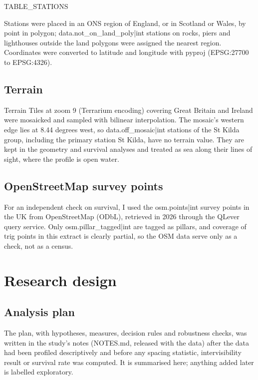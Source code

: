 \documentclass[11pt,a4paper]{article}
\begin{document}
{{TABLE_STATIONS}}

Stations were placed in an ONS region of England, or in Scotland or Wales, by point in polygon; {{data.not_on_land_poly|int}} stations on rocks, piers and lighthouses outside the land polygons were assigned the nearest region. Coordinates were converted to latitude and longitude with pyproj (EPSG:27700 to EPSG:4326).

\subsection{Terrain}
Terrain Tiles at zoom 9 (Terrarium encoding) covering Great Britain and Ireland were mosaicked and sampled with bilinear interpolation. The mosaic's western edge lies at 8.44 degrees west, so {{data.off_mosaic|int}} stations of the St Kilda group, including the primary station St Kilda, have no terrain value. They are kept in the geometry and survival analyses and treated as sea along their lines of sight, where the profile is open water.

\subsection{OpenStreetMap survey points}
For an independent check on survival, I used the {{osm.points|int}} survey points in the UK from OpenStreetMap (ODbL), retrieved in 2026 through the QLever query service. Only {{osm.pillar_tagged|int}} are tagged as pillars, and coverage of trig points in this extract is clearly partial, so the OSM data serve only as a check, not as a census.

\section{Research design}\label{sec:design}
\subsection{Analysis plan}
The plan, with hypotheses, measures, decision rules and robustness checks, was written in the study's notes (NOTES.md, released with the data) after the data had been profiled descriptively and before any spacing statistic, intervisibility result or survival rate was computed. It is summarised here; anything added later is labelled exploratory.
\end{document}
